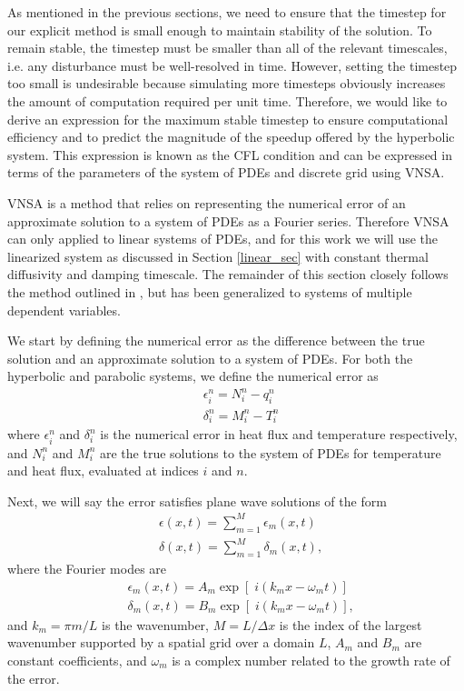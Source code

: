\documentclass[iop]{emulateapj}
\begin{document}
			As mentioned in the previous sections, we need to ensure that the timestep for our explicit method is small enough to maintain stability of the solution.
				To remain stable, the timestep must be smaller than all of the relevant timescales, i.e. any disturbance must be well-resolved in time.
				However, setting the timestep too small is undesirable because simulating more timesteps obviously increases the amount of computation required per unit time.
				Therefore, we would like to derive an expression for the maximum stable timestep to ensure computational efficiency and to predict the magnitude of the speedup offered by the hyperbolic system.
				This expression is known as the \ac{CFL} condition \citep{cfl} and can be expressed in terms of the parameters of the system of \acp{PDE} and discrete grid using \ac{VNSA}.
		
			\ac{VNSA} is a method that relies on representing the numerical error of an approximate solution to a system of \acp{PDE} as a Fourier series.
				Therefore \ac{VNSA} can only applied to linear systems of \acp{PDE}, and for this work we will use the linearized system as discussed in Section \ref{linear_sec} with constant thermal diffusivity and damping timescale. The remainder of this section closely follows the method outlined in \cite{cfd_book}, but has been generalized to systems of multiple dependent variables.
				
			We start by defining the numerical error as the difference between the true solution and an approximate solution to a system of \acp{PDE}.
				For both the hyperbolic and parabolic systems, we define the numerical error as
				\begin{align}
					& \epsilon_i^n = N_i^n - q_i^n \\
					& \delta_i^n = M_i^n - T_i^n
				\end{align}
				where $\epsilon_i^n$ and $\delta_i^n$ is the numerical error in heat flux and temperature respectively, and $N_i^n$ and $M_i^n$ are the true solutions to the system of \acp{PDE} for temperature and heat flux, evaluated at indices $i$ and $n$.
				
			Next, we will say the error satisfies plane wave solutions of the form
				\begin{align}
					& \epsilon(x,t) = \sum_{m=1}^{M} \epsilon_m(x,t) \\
					& \delta(x,t) = \sum_{m=1}^{M} \delta_m(x,t),
				\end{align}
				where the Fourier modes are
				\begin{align}
				& \epsilon_m(x,t) = A_m \exp \left[ \; i (k_m x - \omega_m t) \right] \\
				& \delta_m(x,t) = B_m \exp \left[ \; i (k_m x - \omega_m t) \right],
				\end{align}
				and  $k_m = \pi m /L$ is the wavenumber, $M = L / \Delta x$ is the index of the largest wavenumber supported by a spatial grid over a domain $L$, $A_m$ and $B_m$ are constant coefficients, and $\omega_m$ is a complex number related to the growth rate of the error.
				
\end{document}
